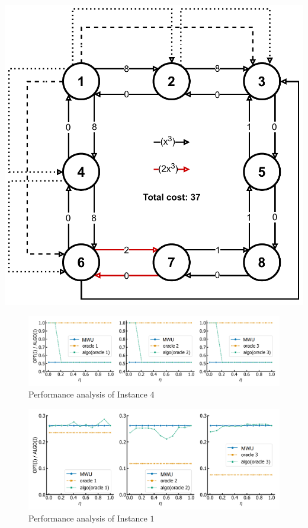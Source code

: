 {\begin{minipage}{0.3\textwidth}
    \end{minipage}
    \begin{minipage}{0.3\textwidth}
        \includegraphics[width=\linewidth]{Img/cex_opt.pdf}
    \end{minipage}
    \label{fig:cex}
}

\begin{figure}[!ht]
    \centering
    \includegraphics[width=\linewidth]{Img/cex_result.png}
    \caption{Performance analysis of Instance $4$}
    \label{fig:cex-perf}
\end{figure}


\begin{figure}[!ht]
    \centering
    \includegraphics[width=\linewidth]{Img/random_tight_result.png}
    \caption{Performance analysis of Instance $1$}
    \label{fig:random}
\end{figure}


